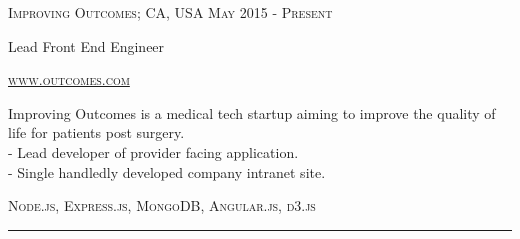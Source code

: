 {
    \textsc{\small{Improving Outcomes; CA, USA
        \hfill
        {\raggedleft
            May 2015 - Present
        } \\
        }
    }
    {\raggedright\large {
        Lead Front End Engineer
    } \\}

    \textsc{\small\href{http://www.outcomes.com}{www.outcomes.com}}

    \normalsize{
        Improving Outcomes is a medical tech startup aiming to improve the quality of life for patients post surgery. \\
        - Lead developer of provider facing application. \\
        - Single handledly developed company intranet site.
    }

    \textsc{\small{\color{highlight}
        Node.js,
        Express.js,
        MongoDB,
        Angular.js,
        d3.js
    }}

    \begin{center}
        \color{highlight}
        \rule{0.5\textwidth}{.4pt}
    \end{center}
}
